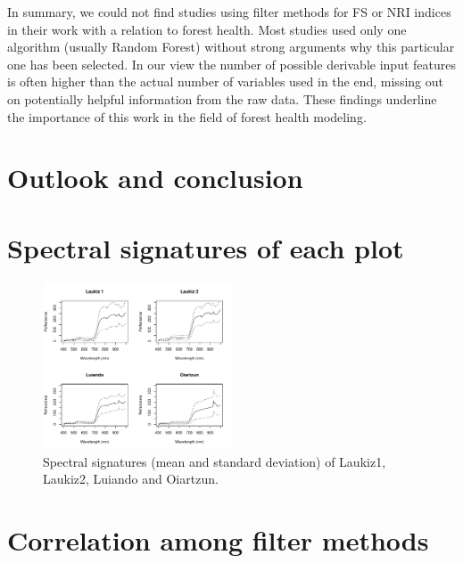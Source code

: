 \documentclass[letterpaper, journal]{IEEEtran}
\begin{document}
In summary, we could not find studies using filter methods for \ac{FS} or \ac{NRI} indices in their work with a relation to forest health.
Most studies used only one algorithm (usually Random Forest) without strong arguments why this particular one has been selected.
In our view the number of possible derivable input features is often higher than the actual number of variables used in the end, missing out on potentially helpful information from the raw data.
These findings underline the importance of this work in the field of forest health modeling.

\section{Outlook and conclusion}

\appendices

\section{Spectral signatures of each plot}

\begin{figure} [h]
\begin{center}
\includegraphics[width=0.5\textwidth] {spectral-signatures-1.pdf}
\caption{Spectral signatures (mean and standard deviation) of Laukiz1, Laukiz2, Luiando and Oiartzun.}
\label{fig:spectral-signatures}
\end{center}
\end{figure}

\pagebreak

\section{Correlation among filter methods}
\end{document}
